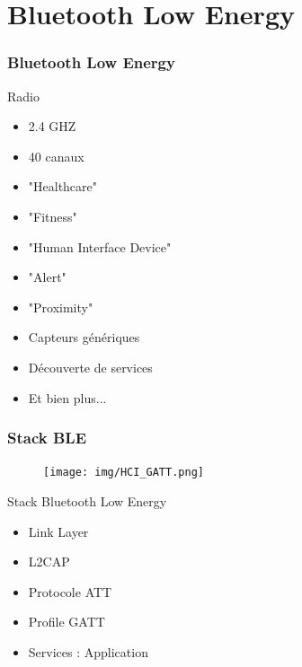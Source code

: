\section{Bluetooth Low Energy}

\begin{frame}
	\frametitle{Bluetooth Low Energy}
	\begin{minipage}[t]{0.30\linewidth}
		\vspace{0.5cm}
		\begin{block}{Radio}
			\begin{itemize}
				\item 2.4 GHZ
				\item 40 canaux
			\end{itemize}
		\end{block}
	\end{minipage}
	\begin{minipage}[t]{0.66\linewidth}
		\vspace{0.5cm}
		\vspace{0.5cm}
		\begin{itemize}
			\item "Healthcare"
			\item "Fitness"
			\item "Human Interface Device"
			\item "Alert"
			\item "Proximity"
			\item Capteurs génériques
			\item Découverte de services
			\item Et bien plus...
		\end{itemize}
	\end{minipage}
\end{frame}

\begin{frame}
	\frametitle{Stack BLE}
	\begin{minipage}{0.45\linewidth}
		\begin{figure}
			\texttt{[image: img/HCI\_GATT.png]}
		\end{figure}
	\end{minipage}
	\begin{minipage}{0.50\linewidth}
		\begin{block}{Stack Bluetooth Low Energy}
			\begin{itemize}
				\item Link Layer
				\item L2CAP
				\item Protocole ATT
				\item Profile GATT
				\item Services : Application
			\end{itemize}
		\end{block}
	\end{minipage}
\end{frame}

